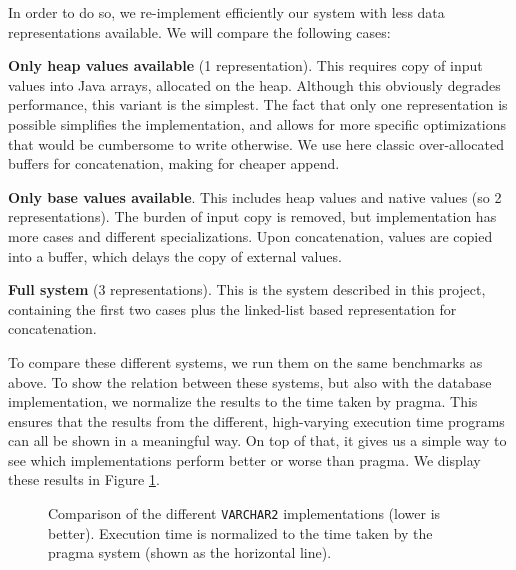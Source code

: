 \documentclass[twoside,11pt,a4paper]{article}
\newcommand{\pls}[1]{\small\texttt{#1}\normalsize}
\newcommand{\plstype}[1]{\pls{#1}}
\newcommand{\varchar}{\plstype{VARCHAR2}}
\newcommand{\benchsystem}[1]{\textsf{#1}}
\newcommand{\ncpg}{\benchsystem{pragma}}
\begin{document}
In order to do so, we re-implement efficiently our system with less data representations available. We will compare the following cases:

\textbf{Only heap values available} (1 representation). This requires copy of input values into Java arrays, allocated on the heap. Although this obviously degrades performance, this variant is the simplest. The fact that only one representation is possible simplifies the implementation, and allows for more specific optimizations that would be cumbersome to write otherwise. We use here classic over-allocated buffers for concatenation, making for cheaper append.

\textbf{Only base values available}. This includes heap values and native values (so 2 representations). The burden of input copy is removed, but implementation has more cases and different specializations. Upon concatenation, values are copied into a buffer, which delays the copy of external values.

\textbf{Full system} (3 representations). This is the system described in this project, containing the first two cases plus the linked-list based representation for concatenation.

To compare these different systems, we run them on the same benchmarks as above. To show the relation between these systems, but also with the database implementation, we normalize the results to the time taken by \ncpg{}. This ensures that the results from the different, high-varying execution time programs can all be shown in a meaningful way. On top of that, it gives us a simple way to see which implementations perform better or worse than \ncpg{}. We display these results in Figure \ref{fig:exp3c}.

\begin{figure}[tp]
	\centering
	\caption[Comparison of the different \varchar{} implementations]{Comparison of the different \varchar{} implementations (lower is better). Execution time is normalized to the time taken by the \ncpg{} system (shown as the horizontal line).}
	\label{fig:exp3c}
\end{figure}
\end{document}

